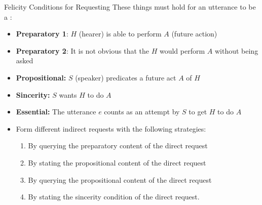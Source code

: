 \documentclass{beamer}
\begin{document}
\begin{frame}{Felicity Conditions for Requesting}
These things must hold for an utterance to be a :
\begin{itemize}
\item \textbf{Preparatory 1}: $H$ (hearer) is able to perform  $A$ (future action)
\item \textbf{Preparatory 2}: It is not obvious that the $H$ would perform $A$  without being asked
\item \textbf{Propositional:} $S$ (speaker) predicates a future act $A$ of $H$
\item \textbf{Sincerity:}  $S$ wants $H$ to do $A$ 
\item \textbf{Essential:} The utterance $e$ counts as an attempt by $S$ to get $H$ to do $A$
\end{itemize}


\begin{itemize}
\item[?]  Form different indirect requests with the following strategies:\task
  \begin{enumerate}
  \item By querying the preparatory content of the direct request
  \item By stating the  propositional content of the direct request
  \item By querying the propositional content of the direct request
  \item By stating the sincerity condition of the direct request.
  \end{enumerate}

\end{itemize}




\end{frame}
\end{document}
